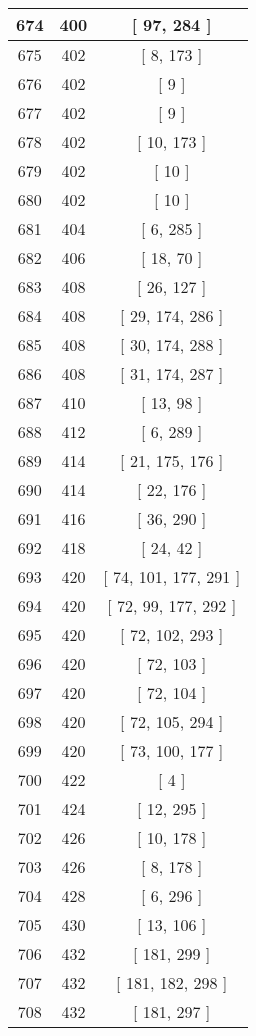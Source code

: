 \begin{center}
\begin{longtable}[H]{|| c c c ||}
\hline
674 & 400 & [ 97, 284 ] \\ 
\hline
675 & 402 & [ 8, 173 ] \\ 
\hline
676 & 402 & [ 9 ] \\ 
\hline
677 & 402 & [ 9 ] \\ 
\hline
678 & 402 & [ 10, 173 ] \\ 
\hline
679 & 402 & [ 10 ] \\ 
\hline
680 & 402 & [ 10 ] \\ 
\hline
681 & 404 & [ 6, 285 ] \\ 
\hline
682 & 406 & [ 18, 70 ] \\ 
\hline
683 & 408 & [ 26, 127 ] \\ 
\hline
684 & 408 & [ 29, 174, 286 ] \\ 
\hline
685 & 408 & [ 30, 174, 288 ] \\ 
\hline
686 & 408 & [ 31, 174, 287 ] \\ 
\hline
687 & 410 & [ 13, 98 ] \\ 
\hline
688 & 412 & [ 6, 289 ] \\ 
\hline
689 & 414 & [ 21, 175, 176 ] \\ 
\hline
690 & 414 & [ 22, 176 ] \\ 
\hline
691 & 416 & [ 36, 290 ] \\ 
\hline
692 & 418 & [ 24, 42 ] \\ 
\hline
693 & 420 & [ 74, 101, 177, 291 ] \\ 
\hline
694 & 420 & [ 72, 99, 177, 292 ] \\ 
\hline
695 & 420 & [ 72, 102, 293 ] \\ 
\hline
696 & 420 & [ 72, 103 ] \\ 
\hline
697 & 420 & [ 72, 104 ] \\ 
\hline
698 & 420 & [ 72, 105, 294 ] \\ 
\hline
699 & 420 & [ 73, 100, 177 ] \\ 
\hline
700 & 422 & [ 4 ] \\ 
\hline
701 & 424 & [ 12, 295 ] \\ 
\hline
702 & 426 & [ 10, 178 ] \\ 
\hline
703 & 426 & [ 8, 178 ] \\ 
\hline
704 & 428 & [ 6, 296 ] \\ 
\hline
705 & 430 & [ 13, 106 ] \\ 
\hline
706 & 432 & [ 181, 299 ] \\ 
\hline
707 & 432 & [ 181, 182, 298 ] \\ 
\hline
708 & 432 & [ 181, 297 ] \\ 

\end{longtable}
\end{center}
